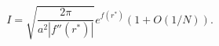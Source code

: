 \begin{equation}
\label{Eq_A07}
I = \sqrt{\frac{2\pi}{a^2|f''(r^{*})|}} e^{f(r^{*})} (1 + O(1/N)).
\end{equation}

